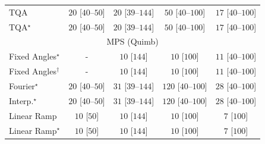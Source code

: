 \begin{tabular}{l|cccc|}
TQA & {\cellcolor[HTML]{F5FBF2}} \color[HTML]{000000} $20$ [$40$--$50$] & {\cellcolor[HTML]{F5FBF2}} \color[HTML]{000000} $20$ [$39$--$144$] & {\cellcolor[HTML]{EFF9EC}} \color[HTML]{000000} $50$ [$40$--$100$] & {\cellcolor[HTML]{F5FBF3}} \color[HTML]{000000} $17$ [$40$--$100$] \\
TQA$^\star$ & {\cellcolor[HTML]{F5FBF2}} \color[HTML]{000000} $20$ [$40$--$50$] & {\cellcolor[HTML]{F5FBF2}} \color[HTML]{000000} $20$ [$39$--$144$] & {\cellcolor[HTML]{EFF9EC}} \color[HTML]{000000} $50$ [$40$--$100$] & {\cellcolor[HTML]{F5FBF3}} \color[HTML]{000000} $17$ [$40$--$100$] \\
\cline{1-5}
\multicolumn{5}{c}{\rule{0pt}{8pt}MPS (Quimb)} \\
\midrule
Fixed Angles$^\star$ & {\cellcolor[HTML]{000000}} \color[HTML]{F1F1F1} {\cellcolor{white}} \color{black} - & {\cellcolor[HTML]{F7FCF5}} \color[HTML]{000000} $10$ [$144$] & {\cellcolor[HTML]{F7FCF5}} \color[HTML]{000000} $10$ [$100$] & {\cellcolor[HTML]{F6FCF4}} \color[HTML]{000000} $11$ [$40$--$100$] \\
Fixed Angles$^\dagger$ & {\cellcolor[HTML]{000000}} \color[HTML]{F1F1F1} {\cellcolor{white}} \color{black} - & {\cellcolor[HTML]{F7FCF5}} \color[HTML]{000000} $10$ [$144$] & {\cellcolor[HTML]{F7FCF5}} \color[HTML]{000000} $10$ [$100$] & {\cellcolor[HTML]{F6FCF4}} \color[HTML]{000000} $11$ [$40$--$100$] \\
Fourier$^\star$ & {\cellcolor[HTML]{F5FBF2}} \color[HTML]{000000} $20$ [$40$--$50$] & {\cellcolor[HTML]{F3FAF0}} \color[HTML]{000000} $31$ [$39$--$144$] & {\cellcolor[HTML]{E0F3DB}} \color[HTML]{000000} $120$ [$40$--$100$] & {\cellcolor[HTML]{F4FBF1}} \color[HTML]{000000} $28$ [$40$--$100$] \\
Interp.$^\star$ & {\cellcolor[HTML]{F5FBF2}} \color[HTML]{000000} $20$ [$40$--$50$] & {\cellcolor[HTML]{F3FAF0}} \color[HTML]{000000} $31$ [$39$--$144$] & {\cellcolor[HTML]{E0F3DB}} \color[HTML]{000000} $120$ [$40$--$100$] & {\cellcolor[HTML]{F4FBF1}} \color[HTML]{000000} $28$ [$40$--$100$] \\
Linear Ramp & {\cellcolor[HTML]{F7FCF5}} \color[HTML]{000000} $10$ [$50$] & {\cellcolor[HTML]{F7FCF5}} \color[HTML]{000000} $10$ [$144$] & {\cellcolor[HTML]{F7FCF5}} \color[HTML]{000000} $10$ [$100$] & {\cellcolor[HTML]{F7FCF5}} \color[HTML]{000000} $7$ [$100$] \\
Linear Ramp$^\star$ & {\cellcolor[HTML]{F7FCF5}} \color[HTML]{000000} $10$ [$50$] & {\cellcolor[HTML]{F7FCF5}} \color[HTML]{000000} $10$ [$144$] & {\cellcolor[HTML]{F7FCF5}} \color[HTML]{000000} $10$ [$100$] & {\cellcolor[HTML]{F7FCF5}} \color[HTML]{000000} $7$ [$100$] \\

\end{tabular}
